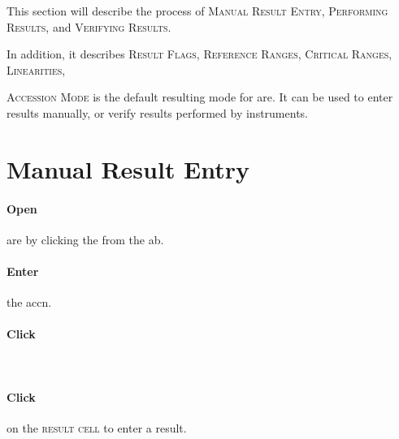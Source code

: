 This section will describe the process of \textsc{Manual Result Entry, Performing Results,} and \textsc{Verifying Results.}

In addition, it describes \textsc{Result Flags, Reference Ranges, Critical Ranges, Linearities, }

\textsc{Accession Mode} is the default resulting mode for \gls{are}. It can be used to enter results manually, or verify results performed by instruments.\\




\section{Manual Result Entry}\label{sec:man_res_entry}

\paragraph{Open} \gls{are} by clicking the  from the \gls{ab}.

\paragraph{Enter} the \gls{accn}.\\


\paragraph{Click} \\


\paragraph{Click} on the \textsc{result cell} to enter a result.\\

\noindent
{}%

